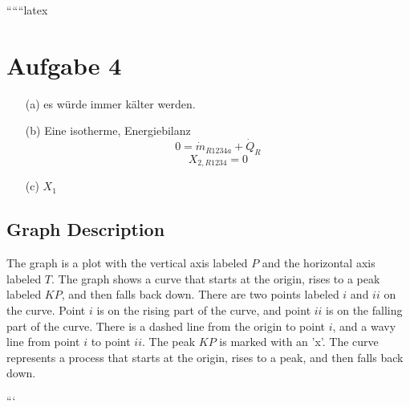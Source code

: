 
``````latex


\section*{Aufgabe 4}

\begin{itemize}
    \item[(a)] es würde immer kälter werden.
    \item[(b)] Eine isotherme, Energiebilanz
    \[
    0 = \dot{m}_{R1234a} + \dot{Q}_{R}
    \]
    \[
    X_{2, R1234} = 0
    \]
    \item[(c)] \(X_1\)
\end{itemize}

\subsection*{Graph Description}
The graph is a plot with the vertical axis labeled \(P\) and the horizontal axis labeled \(T\). The graph shows a curve that starts at the origin, rises to a peak labeled \(KP\), and then falls back down. There are two points labeled \(i\) and \(ii\) on the curve. Point \(i\) is on the rising part of the curve, and point \(ii\) is on the falling part of the curve. There is a dashed line from the origin to point \(i\), and a wavy line from point \(i\) to point \(ii\). The peak \(KP\) is marked with an 'x'. The curve represents a process that starts at the origin, rises to a peak, and then falls back down.

```